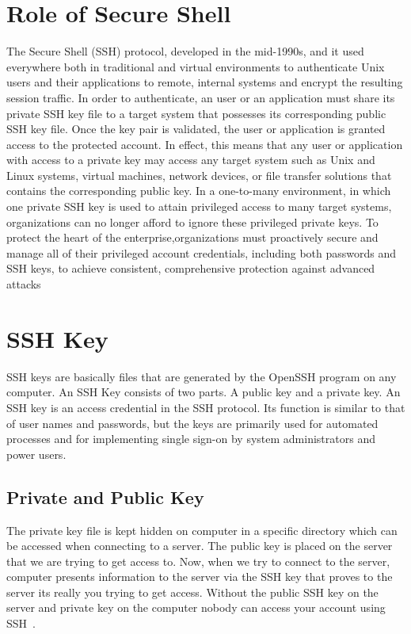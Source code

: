 \section{Role of Secure Shell}
The Secure Shell (SSH) protocol, developed in the mid-1990s, and it  
used everywhere both in traditional and virtual environments to 
authenticate Unix users and their applications to remote, 
internal systems and encrypt the resulting session traffic. 
In order to authenticate, an user or an application must share
its private SSH key file to a target system that possesses its 
corresponding public SSH key file. 
Once the key pair is validated, the user or application is granted 
access to the protected account. In effect, this means that any user
or application with access to a private key may access any target 
system such as Unix and Linux systems, virtual machines, network 
devices, or file transfer solutions that contains the corresponding
public key.
In a one-to-many environment, in which one private SSH key is used 
to attain privileged access to many target systems, organizations 
can no longer afford to ignore these privileged private keys. 
To protect the heart of the enterprise,organizations must 
proactively secure and manage all of their privileged account 
credentials, including both passwords and SSH keys, to achieve
consistent, comprehensive protection against advanced 
attacks~\cite{hid-sp18-513-cyberark}

\section{SSH Key}
SSH keys are basically files that are generated by the OpenSSH program on
any computer. An SSH Key consists of two parts. A public key and a private 
key. An SSH key is an access credential in the SSH protocol. Its function
is similar to that of user names and passwords, but the keys are primarily
used for automated processes and for implementing single sign-on by system
administrators and power users.

\subsection{Private and Public Key}

The private key file is kept hidden on computer in a specific directory 
which can be accessed when connecting to a server. The public key is placed 
on the server that we are trying to get access to. Now, when we try to 
connect to the server, computer presents information to the server via the 
SSH key that proves to the server its really you trying to get access. 
Without the public SSH key on the server and private key on the computer
nobody can access your account using SSH~\cite{hid-sp18-513-sshkeyinc}.


